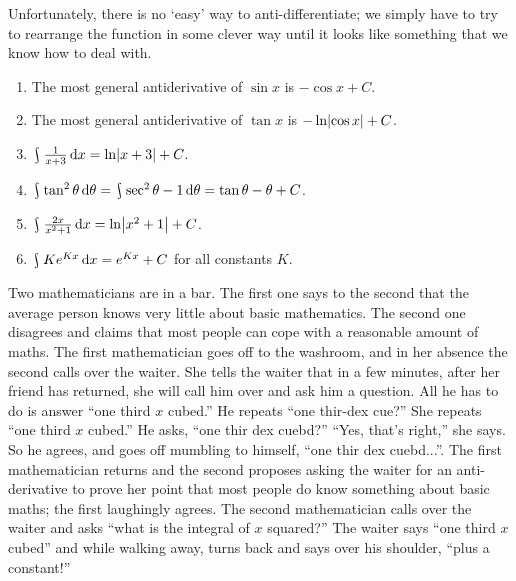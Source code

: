 Unfortunately, there is no `easy' way to anti-differentiate; we simply have to try to rearrange the function in some clever
way until it looks like something that we know how to deal with.

\begin{exs}\leavevmode
  \begin{enumerate}
    \item The most general antiderivative of $ \sin x $ is $ -\cos x + C $.
    \item The most general antiderivative of $ \tan x $ is $ -\ln \abs{\cos x} + C $.
    \item $ \rint \frac{1}{x + 3} \dif{x} = \ln \abs{x + 3} + C $.
    \item $ \rint \tan^2 \theta \dif{\theta} = \rint \sec^2 \theta - 1 \dif{\theta} = \tan \theta - \theta + C $.
    \item $ \rint \frac{2x}{x^2 + 1} \dif{x} = \ln \abs{x^2 + 1} + C $.
    \item $ \rint Ke^{Kx} \dif{x} = e^{Kx} + C $ for all constants $ K $.
  \end{enumerate}
\end{exs}

\begin{joke}
  Two mathematicians are in a bar. The first one says to the second that the average person knows very little about basic
  mathematics. The second one disagrees and claims that most people can cope with a reasonable amount of maths. The first
  mathematician goes off to the washroom, and in her absence the second calls over the waiter. She tells the waiter that in a few
  minutes, after her friend has returned, she will call him over and ask him a question. All he has to do is answer ``one
  third $x$ cubed.'' He repeats ``one thir-dex cue?'' She repeats ``one third $x$ cubed.'' He asks, ``one thir dex cuebd?'' ``Yes,
  that’s right,'' she says. So he agrees, and goes off mumbling to himself, ``one thir dex cuebd...''. The first mathematician returns
  and the second proposes asking the waiter for an anti-derivative to prove her point that most people do know something about basic maths;
  the first laughingly agrees. The second mathematician calls over the waiter and asks ``what is the integral of $x$ squared?'' The waiter
  says ``one third $x$ cubed'' and while walking away, turns back and says over his shoulder, ``plus a constant!''
\end{joke}

